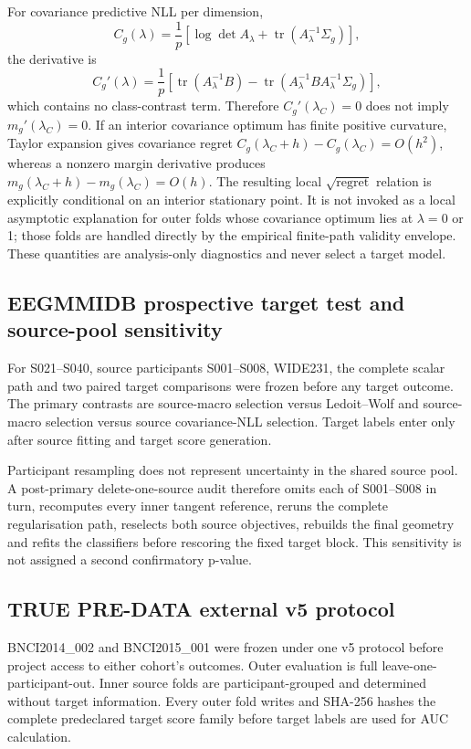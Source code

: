 For covariance predictive NLL per dimension,
\[
 C_g(\lambda)=\frac{1}{p}
 \left[
 \log\det A_\lambda+
 \operatorname{tr}(A_\lambda^{-1}\Sigma_g)
 \right],
\]
the derivative is
\[
 C_g'(\lambda)=\frac{1}{p}
 \left[
 \operatorname{tr}(A_\lambda^{-1}B)
 -
 \operatorname{tr}
 (A_\lambda^{-1}BA_\lambda^{-1}\Sigma_g)
 \right],
\]
which contains no class-contrast term. Therefore
\(C_g'(\lambda_C)=0\) does not imply \(m_g'(\lambda_C)=0\).
If an interior covariance optimum has finite positive curvature,
Taylor expansion gives covariance regret
\(C_g(\lambda_C+h)-C_g(\lambda_C)=O(h^2)\), whereas a nonzero
margin derivative produces \(m_g(\lambda_C+h)-m_g(\lambda_C)=O(h)\).
The resulting local \(\sqrt{\text{regret}}\) relation is explicitly
conditional on an interior stationary point. It is not invoked as a local
asymptotic explanation for outer folds whose covariance optimum lies at
\(\lambda=0\) or 1; those folds are handled directly by the empirical
finite-path validity envelope. These quantities are analysis-only diagnostics
and never select a target model.

\subsection{EEGMMIDB prospective target test and source-pool sensitivity}
For S021--S040, source participants S001--S008, WIDE231, the complete scalar
path and two paired target comparisons were frozen before any target outcome.
The primary contrasts are source-macro selection versus Ledoit--Wolf and
source-macro selection versus source covariance-NLL selection. Target labels
enter only after source fitting and target score generation.

Participant resampling does not represent uncertainty in the shared source
pool. A post-primary delete-one-source audit therefore omits each of
S001--S008 in turn, recomputes every inner tangent reference, reruns the
complete regularisation path, reselects both source objectives, rebuilds the
final geometry and refits the classifiers before rescoring the fixed target
block. This sensitivity is not assigned a second confirmatory p-value.

\subsection{TRUE PRE-DATA external v5 protocol}
BNCI2014\_002 and BNCI2015\_001 were frozen under one v5 protocol before
project access to either cohort's outcomes. Outer evaluation is full
leave-one-participant-out. Inner source folds are participant-grouped and
determined without target information. Every outer fold writes and SHA-256
hashes the complete predeclared target score family before target labels are
used for AUC calculation.

